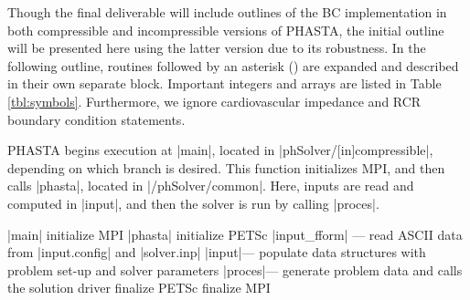 \documentclass[11pt]{article}
\begin{document}
Though the final deliverable will include outlines of the BC implementation in both compressible and incompressible versions of PHASTA, the initial outline will be presented here using the latter version due to its robustness. In the following outline, routines followed by an asterisk (\ra) are expanded and described in their own separate block. Important integers and arrays are listed in Table \ref{tbl:symbols}. Furthermore, we ignore cardiovascular impedance and RCR boundary condition statements.

PHASTA begins execution at |main|, located in |phSolver/[in]compressible|, depending on which branch is desired. This function initializes MPI, and then calls |phasta|, located in |/phSolver/common|. Here, inputs are read and computed in |input|, and then the solver is run by calling |proces|.

\begin{outline}[deep]
\1 |main|
	\2 initialize MPI
	\2 |phasta|
		\3 initialize PETSc
		\3 |input_fform| --- read ASCII data from |input.config| and |solver.inp|
		\3 |input|\ra --- populate data structures with problem set-up and solver parameters
		\3 |proces|\ra --- generate problem data and calls the solution driver
		\3 finalize PETSc
	\2 finalize MPI
\end{outline}
\end{document}
